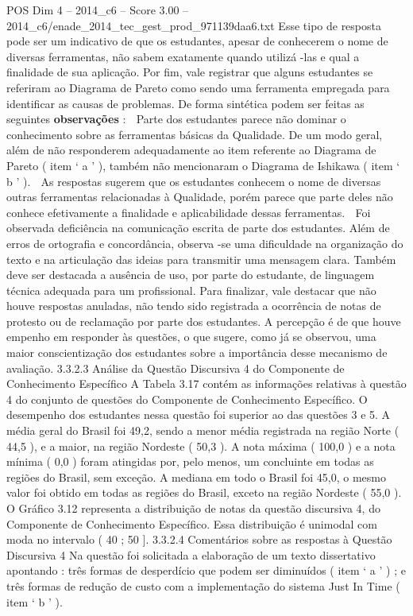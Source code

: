 \begin{textsample}{POS Dim 4 – 2014\_c6 – Score 3.00 – 2014\_c6/enade\_2014\_tec\_gest\_prod\_971139daa6.txt}
Esse tipo de resposta pode ser um indicativo de que os estudantes, apesar de conhecerem o nome de diversas ferramentas, não sabem exatamente quando utilizá -las e qual a finalidade de sua aplicação.
Por fim, vale registrar que alguns estudantes se referiram ao Diagrama de Pareto como sendo uma ferramenta empregada para identificar as causas de problemas.
De forma sintética podem ser feitas as seguintes \textbf{observações} :  Parte dos estudantes parece não dominar o conhecimento sobre as ferramentas básicas da Qualidade.
De um modo geral, além de não responderem adequadamente ao item referente ao Diagrama de Pareto ( item ‘ a ’ ), também não mencionaram o Diagrama de Ishikawa ( item ‘ b ’ ).  As respostas sugerem que os estudantes conhecem o nome de diversas outras ferramentas relacionadas à Qualidade, porém parece que parte deles não conhece efetivamente a finalidade e aplicabilidade dessas ferramentas.  Foi observada deficiência na comunicação escrita de parte dos estudantes.
Além de erros de ortografia e concordância, observa -se uma dificuldade na organização do texto e na articulação das ideias para transmitir uma mensagem clara.
Também deve ser destacada a ausência de uso, por parte do estudante, de linguagem técnica adequada para um profissional.
Para finalizar, vale destacar que não houve respostas anuladas, não tendo sido registrada a ocorrência de notas de protesto ou de reclamação por parte dos estudantes.
A percepção é de que houve empenho em responder às questões, o que sugere, como já se observou, uma maior conscientização dos estudantes sobre a importância desse mecanismo de avaliação. 3.3.2.3 Análise da Questão Discursiva 4 do Componente de Conhecimento Específico A Tabela 3.17 contém as informações relativas à questão 4 do conjunto de questões do Componente de Conhecimento Específico.
O desempenho dos estudantes nessa questão foi superior ao das questões 3 e 5.
A média geral do Brasil foi 49,2, sendo a menor média registrada na região Norte ( 44,5 ), e a maior, na região Nordeste ( 50,3 ).
A nota máxima ( 100,0 ) e a nota mínima ( 0,0 ) foram atingidas por, pelo menos, um concluinte em todas as regiões do Brasil, sem exceção.
A mediana em todo o Brasil foi 45,0, o mesmo valor foi obtido em todas as regiões do Brasil, exceto na região Nordeste ( 55,0 ).
O Gráfico 3.12 representa a distribuição de notas da questão discursiva 4, do Componente de Conhecimento Específico.
Essa distribuição é unimodal com moda no intervalo ( 40 ; 50 ]. 3.3.2.4 Comentários sobre as respostas à Questão Discursiva 4 Na questão foi solicitada a elaboração de um texto dissertativo apontando : três formas de desperdício que podem ser diminuídos ( item ‘ a ’ ) ; e três formas de redução de custo com a implementação do sistema Just In Time ( item ‘ b ’ ).

\end{textsample}
